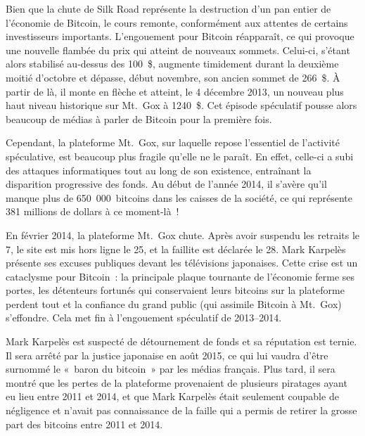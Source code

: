 Bien que la chute de Silk Road représente la destruction d'un pan entier de l'économie de Bitcoin, le cours remonte, conformément aux attentes de certains investisseurs importants. L'engouement pour Bitcoin réapparaît, ce qui provoque une nouvelle flambée du prix qui atteint de nouveaux sommets. Celui-ci, s'étant alors stabilisé au-dessus des 100~\$, augmente timidement durant la deuxième moitié d'octobre et dépasse, début novembre, son ancien sommet de 266~\$. À partir de là, il monte en flèche et atteint, le 4 décembre 2013, un nouveau plus haut niveau historique sur Mt.~Gox à 1240~\$. Cet épisode spéculatif pousse alors beaucoup de médias à parler de Bitcoin pour la première fois.

Cependant, la plateforme Mt.~Gox, sur laquelle repose l'essentiel de l'activité spéculative, est beaucoup plus fragile qu'elle ne le paraît. En effet, celle-ci a subi des attaques informatiques tout au long de son existence, entraînant la disparition progressive des fonds. Au début de l'année 2014, il s'avère qu'il manque plus de 650~000~bitcoins dans les caisses de la société, ce qui représente 381 millions de dollars à ce moment-là~!

En février 2014, la plateforme Mt.~Gox chute. Après avoir suspendu les retraits le 7, le site est mis hors ligne le 25, et la faillite est déclarée le 28. Mark Karpelès présente ses excuses publiques devant les télévisions japonaises. Cette crise est un cataclysme pour Bitcoin~: la principale plaque tournante de l'économie ferme ses portes, les détenteurs fortunés qui conservaient leurs bitcoins sur la plateforme perdent tout et la confiance du grand public (qui assimile Bitcoin à Mt.~Gox) s'effondre. Cela met fin à l'engouement spéculatif de 2013--2014.

Mark Karpelès est suspecté de détournement de fonds et sa réputation est ternie. Il sera arrêté par la justice japonaise en août 2015, ce qui lui vaudra d'être surnommé le «~baron du bitcoin~» par les médias français. Plus tard, il sera montré que les pertes de la plateforme provenaient de plusieurs piratages ayant eu lieu entre 2011 et 2014, et que Mark Karpelès était seulement coupable de négligence et n'avait pas connaissance de la faille qui a permis de retirer la grosse part des bitcoins entre 2011 et 2014. %

